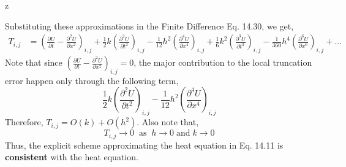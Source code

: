 z\documentclass[a4paper,12pt,twoside]{book}
\newcommand{\pder}[2]{\frac{\partial #1}{\partial #2}}
\newcommand{\bpder}[3]{\left( \pder{#1}{#2}\right)_{#3}}
\begin{document}
Substituting these approximations in the Finite Difference Eq. 14.30, we get,
\begin{equation*}
    \begin{split}
        T_{i,j} &= \left( \pder{U}{t} - \pder{^2U}{x^2} \right)_{i,j} + \frac{1}{2}k\bpder{^2U}{t^2}{i,j} - \frac{1}{12} h^2\bpder{^4U}{x^4}{i,j} + \frac{1}{6}k^2\bpder{^3U}{t^3}{i,j} - \frac{1}{360}h^4\bpder{^6U}{x^6}{i,j} + \dots
    \end{split}
\end{equation*}
Note that since $\left( \pder{U}{t} - \pder{^2U}{x^2} \right)_{i,j} = 0$, the major contribution to the local truncation error happen only through the following term,
\[\frac{1}{2}k\bpder{^2U}{t^2}{i,j} - \frac{1}{12} h^2\bpder{^4U}{x^4}{i,j}\]
Therefore, $T_{i,j} = O(k) + O(h^2)$. Also note that,
\[\boxed{T_{i,j} \to 0 \;\;\text{as}\;\; h\to 0\;\text{and}\;k\to 0}\]
Thus, the explicit scheme approximating the heat equation in Eq. 14.11 is \textbf{consistent} with the heat equation.
\end{document}
